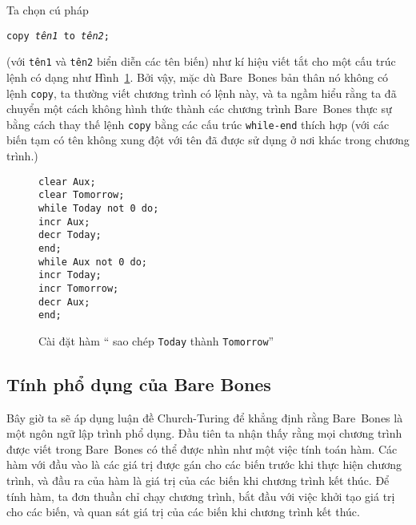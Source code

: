 Ta chọn cú pháp
\begin{flushleft}
\qquad\qquad\qquad  \texttt{copy \textit{tên1} to \textit{tên2};}
\end{flushleft}
(với \texttt{tên1} và \texttt{tên2} biển diễn các tên biến) như kí hiệu viết tắt cho một
cấu trúc lệnh có dạng như Hình~\ref{fig:fig115}. Bởi vậy, mặc dù Bare~Bones bản thân nó
không có lệnh \texttt{copy}, ta thường viết chương trình có lệnh này, và ta ngầm hiểu rằng
ta đã chuyển một cách không hình thức thành các chương trình Bare~Bones thực sự bằng cách
thay thế lệnh \texttt{copy} bằng các cấu trúc \texttt{while-end} thích hợp (với các biến
tạm có tên không xung đột với tên đã được sử dụng ở nơi khác trong chương trình.)

\begin{figure}[tbh]
  \begin{flushleft}
    \qquad \qquad\qquad  \texttt{clear Aux;}\\
    \qquad \qquad\qquad  \texttt{clear Tomorrow;}\\
    \qquad \qquad\qquad \texttt{while Today not 0 do;} \\
    \qquad \qquad\qquad \qquad \texttt{incr  Aux;} \\
    \qquad \qquad\qquad \qquad \texttt{decr Today;} \\
    \qquad \qquad\qquad \texttt{end;} \\

    \qquad\qquad \qquad \texttt{while Aux not 0 do;} \\
    \qquad\qquad \qquad \qquad \texttt{incr Today;} \\
    \qquad\qquad \qquad \qquad \texttt{incr Tomorrow;} \\
    \qquad\qquad \qquad \qquad \texttt{decr Aux;} \\
    \qquad\qquad \qquad \texttt{end;}
  \end{flushleft}
  \caption{Cài đặt hàm `` sao chép \texttt{Today} thành
    \texttt{Tomorrow}''}
  \label{fig:fig115}  
\end{figure}  

\subsection*{Tính phổ dụng của Bare Bones}
Bây giờ ta sẽ áp dụng luận đề Church-Turing để khẳng định rằng Bare~Bones là một ngôn ngữ
lập trình phổ dụng. Đầu tiên ta nhận thấy rằng mọi chương trình được viết trong Bare~Bones
có thể được nhìn như một việc tính toán hàm. Các hàm với đầu vào là các giá trị được gán
cho các biến trước khi thực hiện chương trình, và đầu ra của hàm là giá trị của các biến
khi chương trình kết thúc. Để tính hàm, ta đơn thuần chỉ chạy chương trình, bắt đầu
với việc khởi tạo giá trị cho các biến, và quan sát giá trị của các biến khi chương trình
kết thúc.

